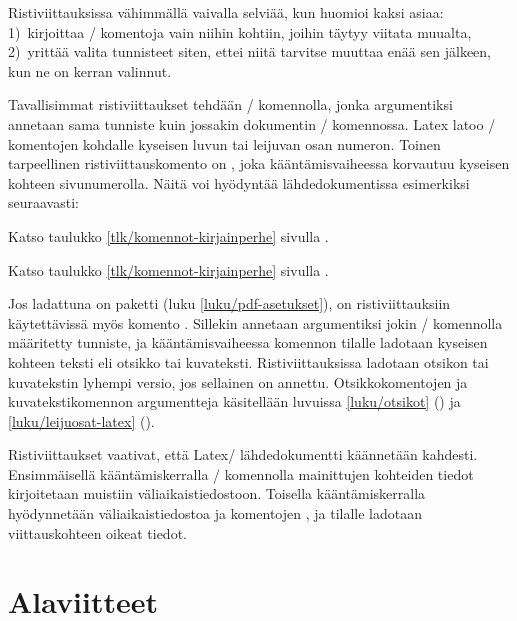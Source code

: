 \noindent
Ristiviittauksissa vähimmällä vaivalla selviää, kun huomioi kaksi asiaa:
1)~kirjoittaa \-/ komentoja vain niihin kohtiin, joihin
täytyy viitata muualta, 2)~yrittää valita tunnisteet siten, ettei niitä
tarvitse muuttaa enää sen jälkeen, kun ne on kerran valinnut.

Tavallisimmat ristiviittaukset tehdään \-/ komennolla,
jonka argumentiksi annetaan sama tunniste kuin jossakin dokumentin
\-/ komennossa. Latex latoo \-/ komentojen
kohdalle kyseisen luvun tai leijuvan osan numeron. Toinen tarpeellinen
ristiviittauskomento on , joka kääntämisvaiheessa
korvautuu kyseisen kohteen sivunumerolla. Näitä voi hyödyntää
lähdedokumentissa esimerkiksi seuraavasti:

\begin{koodilohkosis}
Katso taulukko \ref{tlk/komennot-kirjainperhe} sivulla
\pageref{tlk/komennot-kirjainperhe}.
\end{koodilohkosis}

\begin{tulossis}
  Katso taulukko \ref{tlk/komennot-kirjainperhe} sivulla
  \pageref{tlk/komennot-kirjainperhe}.
\end{tulossis}

\noindent
Jos ladattuna on paketti  (luku
\ref{luku/pdf-asetukset}), on ristiviittauksiin käytettävissä myös
komento . Sillekin annetaan argumentiksi jokin
\-/ komennolla määritetty tunniste, ja kääntämisvaiheessa
komennon tilalle ladotaan kyseisen kohteen teksti eli otsikko tai
kuvateksti. Ristiviittauksissa ladotaan otsikon tai kuvatekstin lyhempi
versio, jos sellainen on annettu. Otsikkokomentojen ja
kuvatekstikomennon argumentteja käsitellään luvuissa \ref{luku/otsikot}
() ja \ref{luku/leijuosat-latex}
().

Ristiviittaukset vaativat, että Latex\-/ lähdedokumentti käännetään
kahdesti. Ensimmäisellä kääntämiskerralla \-/ komennolla
mainittujen kohteiden tiedot kirjoitetaan muistiin väliaikaistiedostoon.
Toisella kääntämiskerralla hyödynnetään väliaikaistiedostoa ja
komentojen ,  ja  tilalle
ladotaan viittauskohteen oikeat tiedot.

\section{Alaviitteet}
\label{luku/alaviitteet}

